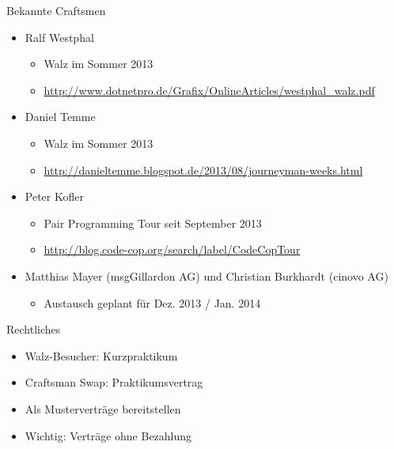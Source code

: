 \begin{frame}{Bekannte Craftsmen}

\begin{itemize}
\item Ralf Westphal
\begin{itemize}
\item Walz im Sommer 2013
\item \url{http://www.dotnetpro.de/Grafix/OnlineArticles/westphal_walz.pdf}
\end{itemize}


\item Daniel Temme
\begin{itemize}
\item Walz im Sommer 2013
\item \url{http://danieltemme.blogspot.de/2013/08/journeyman-weeks.html}
\end{itemize}

\item Peter Kofler
\begin{itemize}
\item \glqq{}Pair Programming Tour\grqq{} seit September 2013
\item \url{http://blog.code-cop.org/search/label/CodeCopTour}
\end{itemize}

\item Matthias Mayer (msgGillardon AG) und Christian Burkhardt (cinovo AG)
\begin{itemize}
\item Austausch geplant für Dez. 2013 / Jan. 2014
\end{itemize}


\end{itemize}

\end{frame}

\begin{frame}{Rechtliches}

\begin{itemize}
\item Walz-Besucher: Kurzpraktikum

\item Craftsman Swap: Praktikumsvertrag

\item Als Musterverträge bereitstellen

\item Wichtig: Verträge ohne Bezahlung

\end{itemize}

\end{frame}


